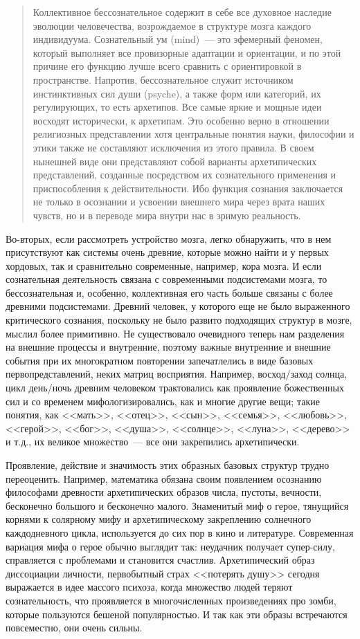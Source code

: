 \documentclass[a5paper,12pt,twoside]{memoir}
\begin{document}
\begin{quotation}
Коллективное бессознательное содержит в себе все духовное наследие эволюции человечества, возрождаемое в структуре мозга каждого индивидуума. Сознательный ум (mind)~--- это эфемерный феномен, который выполняет все провизорные адаптации и ориентации, и по этой причине его функцию лучше всего сравнить с ориентировкой в пространстве. Напротив, бессознательное служит источником инстинктивных сил души (psyche), а также форм или категорий, их регулирующих, то есть архетипов. Все самые яркие и мощные идеи восходят исторически, к архетипам. Это особенно верно в отношении религиозных представлении хотя центральные понятия науки, философии и этики также не составляют исключения из этого правила. В своем нынешней виде они представляют собой варианты архетипических представлений, созданные посредством их сознательного применения и приспособления к действительности. Ибо функция сознания заключается не только в осознании и усвоении внешнего мира через врата наших чувств, но и в переводе мира внутри нас в зримую реальность. 
\end{quotation}


Во-вторых, если рассмотреть устройство мозга, легко обнаружить, что в нем присутствуют как системы очень древние, которые можно найти и у первых хордовых, так и сравнительно современные, например, кора мозга. И если сознательная деятельность связана с современными подсистемами мозга, то бессознательная и, особенно, коллективная его часть больше связаны с более древними подсистемами. Древний человек, у которого еще не было выраженного критического сознания, поскольку не было развито подходящих структур в мозге, мыслил более примитивно. Не существовало очевидного теперь нам разделения на внешние процессы и внутренние, поэтому важные внутренние и внешние события при их многократном повторении запечатлелись в виде базовых первопредставлений, неких матриц восприятия. Например, восход/заход солнца, цикл день/ночь древним человеком трактовались как проявление божественных сил и со временем мифологизировались, как и многие другие вещи; такие понятия, как <<мать>>, <<отец>>, <<сын>>, <<семья>>, <<любовь>>, <<герой>>, <<бог>>, <<душа>>, <<солнце>>, <<луна>>, <<дерево>> и т.д., их великое множество~--- все они закрепились архетипически.

Проявление, действие и значимость этих образных базовых структур трудно переоценить. Например, математика обязана своим появлением осознанию философами древности архетипических образов числа, пустоты, вечности, бесконечно большого и бесконечно малого. Знаменитый миф о герое, тянущийся корнями к солярному мифу и архетипическому закреплению солнечного каждодневного цикла, используется до сих пор в кино и литературе. Современная вариация мифа о герое обычно выглядит так: неудачник получает супер-силу, справляется с проблемами и становится счастлив. Архетипический образ диссоциации личности, первобытный страх <<потерять душу>> сегодня выражается в идее массого психоза, когда множество людей теряют сознательность, что проявляется в многочисленных произведениях про зомби, которые пользуются бешеной популярностью. И так как эти образы встречаются повсеместно, они очень сильны.
\end{document}
